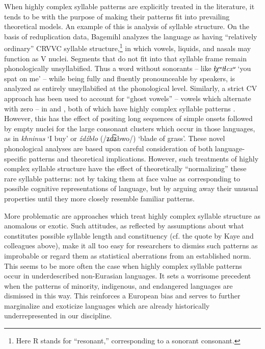   When highly complex syllable patterns are explicitly treated in the literature, it tends to be with the purpose of making their patterns fit into prevailing theoretical models. An example of this is  analysis of  syllable structure. On the basis of reduplication data, Bagemihl analyzes the language as having “relatively ordinary” CRVVC syllable structure,\footnote{{Here R stands for ``resonant,'' corresponding to a sonorant consonant.}} in which vowels, liquids, and nasals may function as V nuclei. Segments that do not fit into that syllable frame remain phonologically unsyllabified. Thus a word without sonorants -- like \textit{ɬχʷtɬcxʷ} ‘you spat on me’ -- while being fully and fluently pronounceable by speakers, is analyzed as entirely unsyllabified at the phonological level. Similarly, a strict CV approach has been used to account for ``ghost vowels'' -- vowels which alternate with zero -- in  and , both of which have highly complex syllable patterns \citep{Rowicka1999}. However, this has the effect of positing long sequences of simple onsets followed by empty nuclei for the large consonant clusters which occur in those languages, as in  \textit{khninus} ‘I buy’ or  \textit{źdźbło} (/ʑd͡ʑbwo/) ‘blade of grass’. These novel phonological analyses are based upon careful consideration of both language-specific patterns and theoretical implications. However, such treatments of highly complex syllable structure have the effect of theoretically ``normalizing'' these rare syllable patterns: not by taking them at face value as corresponding to possible cognitive representations of language, but by arguing away their unusual properties until they more closely resemble familiar patterns.

  More problematic are approaches which treat highly complex syllable structure as anomalous or exotic. Such attitudes, as reflected by assumptions about what constitutes possible syllable length and constituency (cf. the quote by Kaye and colleagues above), make it all too easy for researchers to dismiss such patterns as improbable or regard them as statistical aberrations from an established norm. This seems to be more often the case when highly complex syllable patterns occur in underdescribed non-Eurasian languages. It sets a worrisome precedent when the patterns of minority, indigenous, and endangered languages are dismissed in this way. This reinforces a European bias and serves to further marginalize and exoticize languages which are already historically underrepresented in our discipline.

